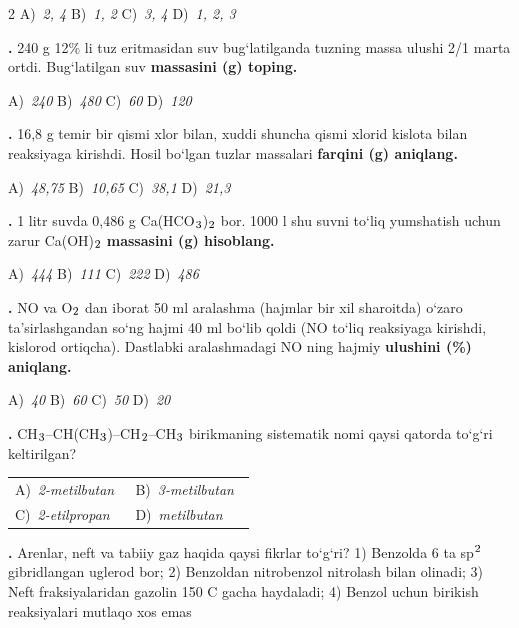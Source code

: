 \documentclass[11pt,a4paper]{article}
\renewcommand{\textsubscript}[1]{\ensuremath{_{\text{\fontsize{8}{8}\selectfont #1}}}}
\renewcommand{\textsuperscript}[1]{\ensuremath{^{\text{\fontsize{8}{8}\selectfont #1}}}}
\newcommand{\qn}[1]{\textbf{\fontsize{11.5}{13}\selectfont #1}}
\newcommand{\qsep}{\par\vspace{13pt}}
\begin{document}
\begin{multicols}{2}
\noindent A)~\textsl{2, 4} \hfill B)~\textsl{1, 2} \hfill C)~\textsl{3, 4} \hfill D)~\textsl{1, 2, 3}\par
\qsep
\noindent\qn{16.} 240 g 12\% li tuz eritmasidan suv bug`latilganda tuzning massa ulushi 2/1 marta ortdi. Bug`latilgan suv \textbf{massasini (g) toping.}

\noindent A)~\textsl{240} \hfill B)~\textsl{480} \hfill C)~\textsl{60} \hfill D)~\textsl{120}\par
\qsep
\noindent\qn{17.} 16,8 g temir bir qismi xlor bilan, xuddi shuncha qismi xlorid kislota bilan reaksiyaga kirishdi. Hosil bo`lgan tuzlar massalari \textbf{farqini (g) aniqlang.}

\noindent A)~\textsl{48,75} \hfill B)~\textsl{10,65} \hfill C)~\textsl{38,1} \hfill D)~\textsl{21,3}\par
\qsep
\noindent\qn{18.} 1 litr suvda 0,486 g Ca(HCO\textsubscript{3})\textsubscript{2} bor. 1000 l shu suvni to`liq yumshatish uchun zarur Ca(OH)\textsubscript{2} \textbf{massasini (g) hisoblang.}

\noindent A)~\textsl{444} \hfill B)~\textsl{111} \hfill C)~\textsl{222} \hfill D)~\textsl{486}\par
\qsep
\noindent\qn{19.} NO va O\textsubscript{2} dan iborat 50 ml aralashma (hajmlar bir xil sharoitda) o`zaro ta'sirlashgandan so`ng hajmi 40 ml bo`lib qoldi (NO to`liq reaksiyaga kirishdi, kislorod ortiqcha). Dastlabki aralashmadagi NO ning hajmiy \textbf{ulushini (\%) aniqlang.}

\noindent A)~\textsl{40} \hfill B)~\textsl{60} \hfill C)~\textsl{50} \hfill D)~\textsl{20}\par
\qsep
\noindent\qn{20.} CH\textsubscript{3}--CH(CH\textsubscript{3})--CH\textsubscript{2}--CH\textsubscript{3} birikmaning sistematik nomi qaysi qatorda to`g`ri keltirilgan?

\noindent\begin{tabular}{@{}p{0.47\linewidth}@{}p{0.47\linewidth}@{}}
A)~\textsl{2-metilbutan} & B)~\textsl{3-metilbutan} \\
C)~\textsl{2-etilpropan} & D)~\textsl{metilbutan} \\
\end{tabular}\par
\qsep
\noindent\qn{21.} Arenlar, neft va tabiiy gaz haqida qaysi fikrlar to`g`ri? 1) Benzolda 6 ta sp\textsuperscript{2} gibridlangan uglerod bor; 2) Benzoldan nitrobenzol nitrolash bilan olinadi; 3) Neft fraksiyalaridan gazolin 150 \textdegree{}C gacha haydaladi; 4) Benzol uchun birikish reaksiyalari mutlaqo xos emas


\end{multicols}
\end{document}
